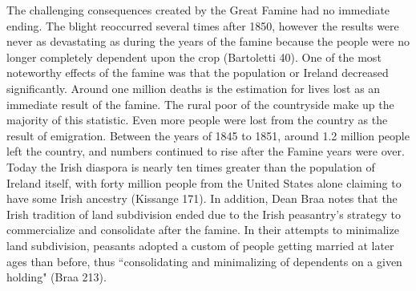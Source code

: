 \begin{Spacing}{1.5}

\hspace{.4in}The challenging consequences created by the Great Famine had no immediate ending. The blight reoccurred several times after 1850, however the results were never as devastating as during the years of the famine because the people were no longer completely dependent upon the crop (Bartoletti 40). One of the most noteworthy effects of the famine was that the population or Ireland decreased significantly. Around one million deaths is the estimation for lives lost as an immediate result of the famine. The rural poor of the countryside make up the majority of this statistic. Even more people were lost from the country as the result of emigration. Between the years of 1845 to 1851, around 1.2 million people left the country, and numbers continued to rise after the Famine years were over. Today the Irish diaspora is nearly ten times greater than the population of Ireland itself, with forty million people from the United States alone claiming to have some Irish ancestry (Kissange 171). In addition, Dean Braa notes that the Irish tradition of land subdivision ended due to the Irish peasantry’s strategy to commercialize and consolidate after the famine. In their attempts to minimalize land subdivision, peasants adopted a custom of people getting married at later ages than before, thus “consolidating and minimalizing of dependents on a given holding" (Braa 213).


\end{Spacing}
